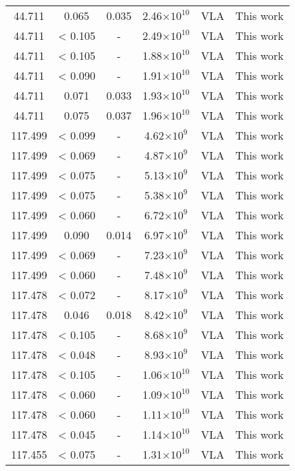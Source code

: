 \documentclass{aa}
\begin{document}
{\begin{longtable}{c|c|c|c|c|c}
 44.711 &   0.065   &  0.035 &  2.46$\times 10^{10}$ &  VLA & This work \\
 44.711 &   < 0.105 &  -     &  2.49$\times 10^{10}$ &  VLA & This work \\
 44.711 &   < 0.105 &  -     &  1.88$\times 10^{10}$ &  VLA & This work \\
 44.711 &   < 0.090 &  -     &  1.91$\times 10^{10}$ &  VLA & This work \\
 44.711 &   0.071   &  0.033 &  1.93$\times 10^{10}$ &  VLA & This work \\
 44.711 &   0.075   &  0.037 &  1.96$\times 10^{10}$ &  VLA & This work \\
117.499 &   < 0.099 &  -     &  4.62$\times 10^{9}$  &  VLA & This work \\
117.499 &   < 0.069 &  -     &  4.87$\times 10^{9}$  &  VLA & This work \\
117.499 &   < 0.075 &  -     &  5.13$\times 10^{9}$  &  VLA & This work \\
117.499 &   < 0.075 &  -     &  5.38$\times 10^{9}$  &  VLA & This work \\
117.499 &   < 0.060 &  -     &  6.72$\times 10^{9}$  &  VLA & This work \\
117.499 &   0.090   &  0.014 &  6.97$\times 10^{9}$  &  VLA & This work \\
117.499 &   < 0.069 &  -     &  7.23$\times 10^{9}$  &  VLA & This work \\
117.499 &   < 0.060 &  -     &  7.48$\times 10^{9}$  &  VLA & This work \\
117.478 &   < 0.072 &  -     &  8.17$\times 10^{9}$  &  VLA & This work \\
117.478 &   0.046   &  0.018 &  8.42$\times 10^{9}$  &  VLA & This work \\
117.478 &   < 0.105 &  -     &  8.68$\times 10^{9}$  &  VLA & This work \\
117.478 &   < 0.048 &  -     &  8.93$\times 10^{9}$  &  VLA & This work \\
117.478 &   < 0.105 &  -     &  1.06$\times 10^{10}$ &  VLA & This work \\
117.478 &   < 0.060 &  -     &  1.09$\times 10^{10}$ &  VLA & This work \\
117.478 &   < 0.060 &  -     &  1.11$\times 10^{10}$ &  VLA & This work \\
117.478 &   < 0.045 &  -     &  1.14$\times 10^{10}$ &  VLA & This work \\
117.455 &   < 0.075 &  -     &  1.31$\times 10^{10}$ &  VLA & This work \\

\end{longtable}}
\end{document}

